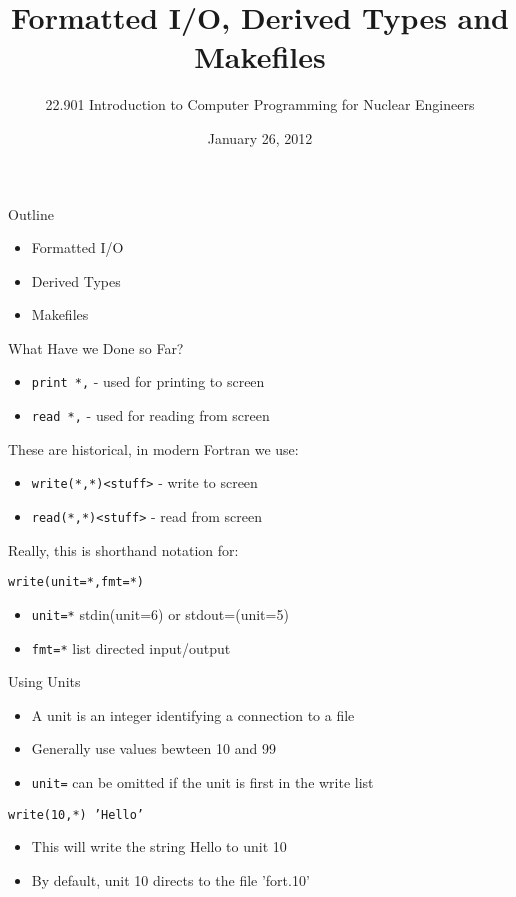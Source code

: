 \documentclass{beamer}
\title[]{Formatted I/O, Derived Types and Makefiles}
\author[]{22.901 Introduction to Computer Programming for Nuclear Engineers}
\institute[\insertpagenumber]{}
\date{January 26, 2012}
\begin{document}

\frame{\titlepage}

\begin{frame}{Outline}
  \begin{itemize}
    \item Formatted I/O
    \vfill\item Derived Types
    \vfill\item Makefiles
  \end{itemize}
\end{frame}
\begin{frame}{What Have we Done so Far?}

  \begin{itemize}
   \item \texttt{print *,} - used for printing to screen
   \item \texttt{read *,} - used for reading from screen
  \end{itemize}
  \vfill
  These are historical, in modern Fortran we use:
  \begin{itemize}
    \item \texttt{write(*,*)<stuff>} - write to screen
    \item \texttt{read(*,*)<stuff>} - read from screen
  \end{itemize}
  \vfill
  Really, this is shorthand notation for: \\
  \begin{center}
    \texttt{write(unit=*,fmt=*)}
  \end{center}
  \vfill
  \begin{itemize}
    \item \texttt{unit=*} stdin(unit=6) or stdout=(unit=5)
    \item \texttt{fmt=*} list directed input/output
  \end{itemize}

\end{frame}
\begin{frame}{Using Units}

  \begin{itemize}
    \item A unit is an integer identifying a connection to a file
    \vfill\item Generally use values bewteen 10 and 99
    \vfill\item \texttt{unit=} can be omitted if the unit is first in the write list
  \end{itemize}
  \vfill
  \begin{center}
    \texttt{write(10,*) 'Hello'}
  \end{center}
  \begin{itemize}
    \vfill\item This will write the string Hello to unit 10
    \vfill\item By default, unit 10 directs to the file 'fort.10'
  \end{itemize}

\end{frame}
\end{document}
